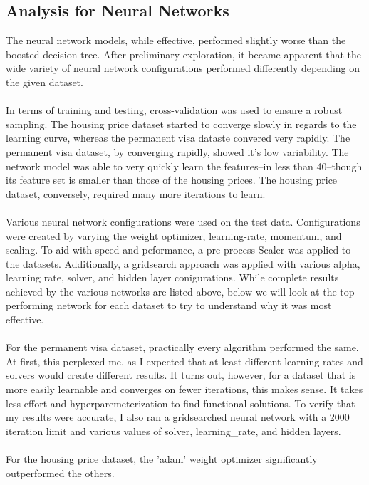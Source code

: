 \documentclass[h]{article}
\begin{document}
\subsection*{Analysis for Neural Networks}
The neural network models, while effective, performed slightly worse 
than the boosted decision tree.  After preliminary exploration, it became 
apparent that the wide variety of neural network configurations performed 
differently depending on the given  dataset.
\\ \\
In terms of training and testing, cross-validation was used to ensure a robust 
sampling.  The housing price dataset started to converge slowly in regards to 
the learning curve, whereas the permanent visa dataste convered very rapidly.  
The permanent visa dataset, by converging rapidly, showed it's low variability.  
The network model was able to very quickly learn the features--in less than 40--though its feature set is
 smaller than those of the housing prices.  The housing price dataset, 
 conversely, required many more iterations to learn.  
 \\ \\
 Various neural network configurations were used on the test data.  Configurations were created by 
 varying the weight optimizer, learning-rate, momentum, and scaling.  To aid 
 with speed and peformance, a pre-process Scaler was applied to the datasets.
 Additionally, a gridsearch approach was applied with various alpha, learning 
 rate, solver, and hidden layer conigurations.  While complete results achieved by the various networks are listed
  above, below we will look at the top performing network for each dataset to try to 
  understand why it was most effective.
  \\ \\
  For the permanent visa dataset, practically every algorithm performed the same.  At first, this perplexed me, 
  as I expected that at least different learning rates and solvers would create 
  different results.  It turns out, however, for a dataset that is more easily 
  learnable and converges on fewer iterations, this makes sense.  It takes less 
  effort and hyperparemeterization to find functional solutions.  To verify that 
  my results were accurate, I also ran a gridsearched neural network with a 2000 
  iteration limit and various values of solver, learning\_rate, and hidden 
  layers.
  \\ \\
  For the housing price dataset, the 'adam' weight optimizer significantly outperformed the others.  
\end{document}
